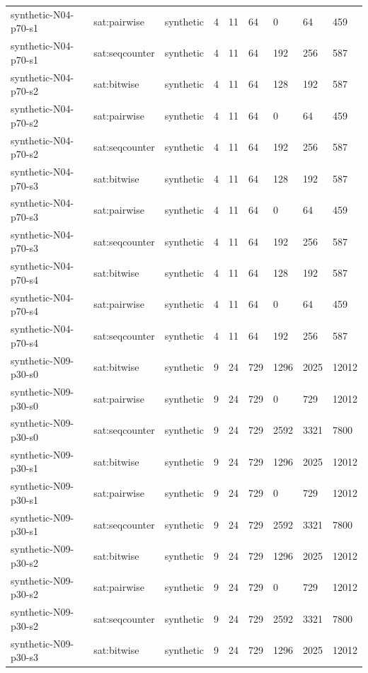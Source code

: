 \begin{tabular}{lllllllll}
synthetic-N04-p70-s1 & sat:pairwise & synthetic & 4 & 11 & 64 & 0 & 64 & 459 \\
synthetic-N04-p70-s1 & sat:seqcounter & synthetic & 4 & 11 & 64 & 192 & 256 & 587 \\
synthetic-N04-p70-s2 & sat:bitwise & synthetic & 4 & 11 & 64 & 128 & 192 & 587 \\
synthetic-N04-p70-s2 & sat:pairwise & synthetic & 4 & 11 & 64 & 0 & 64 & 459 \\
synthetic-N04-p70-s2 & sat:seqcounter & synthetic & 4 & 11 & 64 & 192 & 256 & 587 \\
synthetic-N04-p70-s3 & sat:bitwise & synthetic & 4 & 11 & 64 & 128 & 192 & 587 \\
synthetic-N04-p70-s3 & sat:pairwise & synthetic & 4 & 11 & 64 & 0 & 64 & 459 \\
synthetic-N04-p70-s3 & sat:seqcounter & synthetic & 4 & 11 & 64 & 192 & 256 & 587 \\
synthetic-N04-p70-s4 & sat:bitwise & synthetic & 4 & 11 & 64 & 128 & 192 & 587 \\
synthetic-N04-p70-s4 & sat:pairwise & synthetic & 4 & 11 & 64 & 0 & 64 & 459 \\
synthetic-N04-p70-s4 & sat:seqcounter & synthetic & 4 & 11 & 64 & 192 & 256 & 587 \\
synthetic-N09-p30-s0 & sat:bitwise & synthetic & 9 & 24 & 729 & 1296 & 2025 & 12012 \\
synthetic-N09-p30-s0 & sat:pairwise & synthetic & 9 & 24 & 729 & 0 & 729 & 12012 \\
synthetic-N09-p30-s0 & sat:seqcounter & synthetic & 9 & 24 & 729 & 2592 & 3321 & 7800 \\
synthetic-N09-p30-s1 & sat:bitwise & synthetic & 9 & 24 & 729 & 1296 & 2025 & 12012 \\
synthetic-N09-p30-s1 & sat:pairwise & synthetic & 9 & 24 & 729 & 0 & 729 & 12012 \\
synthetic-N09-p30-s1 & sat:seqcounter & synthetic & 9 & 24 & 729 & 2592 & 3321 & 7800 \\
synthetic-N09-p30-s2 & sat:bitwise & synthetic & 9 & 24 & 729 & 1296 & 2025 & 12012 \\
synthetic-N09-p30-s2 & sat:pairwise & synthetic & 9 & 24 & 729 & 0 & 729 & 12012 \\
synthetic-N09-p30-s2 & sat:seqcounter & synthetic & 9 & 24 & 729 & 2592 & 3321 & 7800 \\
synthetic-N09-p30-s3 & sat:bitwise & synthetic & 9 & 24 & 729 & 1296 & 2025 & 12012 \\

\end{tabular}
